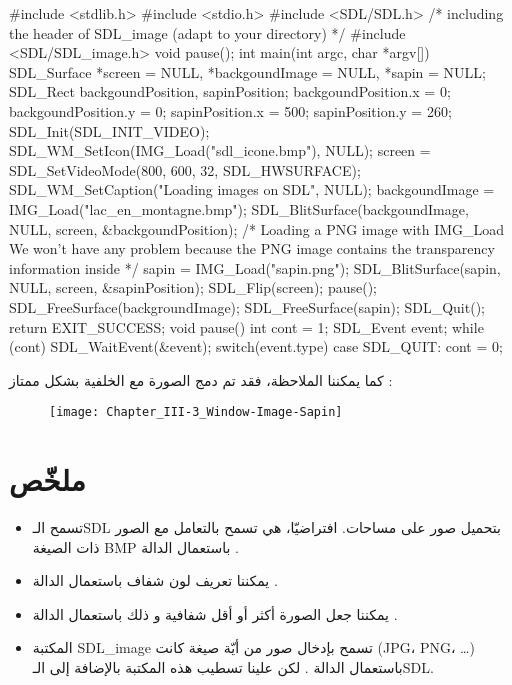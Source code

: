 \begin{Csource}
#include <stdlib.h>
#include <stdio.h>
#include <SDL/SDL.h>
/* including the header of SDL_image (adapt to your directory) */
#include <SDL/SDL_image.h> 
void pause();
int main(int argc, char *argv[])
{
	SDL_Surface *screen = NULL, *backgoundImage = NULL, *sapin = NULL;
	SDL_Rect backgoundPosition, sapinPosition;
	backgoundPosition.x = 0;
	backgoundPosition.y = 0;
	sapinPosition.x = 500;
	sapinPosition.y = 260;
	SDL_Init(SDL_INIT_VIDEO);
	SDL_WM_SetIcon(IMG_Load("sdl_icone.bmp"), NULL);
	screen = SDL_SetVideoMode(800, 600, 32, SDL_HWSURFACE);
	SDL_WM_SetCaption("Loading images on SDL", NULL);
	backgoundImage = IMG_Load("lac_en_montagne.bmp");
	SDL_BlitSurface(backgoundImage, NULL, screen, &backgoundPosition);
	/* Loading a PNG image with IMG_Load
	We won't have any problem because the PNG image contains the transparency information inside */
	sapin = IMG_Load("sapin.png");
	SDL_BlitSurface(sapin, NULL, screen, &sapinPosition); 
	SDL_Flip(screen);
	pause();
	SDL_FreeSurface(backgroundImage);
	SDL_FreeSurface(sapin);
	SDL_Quit();
	return EXIT_SUCCESS;
} 
void pause()
{
	int cont = 1;
	SDL_Event event;
	while (cont)
	{
		SDL_WaitEvent(&event);
		switch(event.type)
		{
			case SDL_QUIT:
			cont = 0;
		}
	}
}
\end{Csource}

كما يمكننا الملاحظة، فقد تم دمج الصورة مع الخلفية بشكل ممتاز :

\begin{figure}[H]
	\centering
	\texttt{[image: Chapter\_III-3\_Window-Image-Sapin]}
\end{figure}

\section*{ملخّص}

\begin{itemize}
	\item تسمح الـ\textenglish{SDL}
	بتحميل صور على مساحات. افتراضيّا، هي تسمح بالتعامل مع الصور ذات الصيغة
	\textenglish{BMP}
	باستعمال الدالة
	.
	\item يمكننا تعريف لون شفاف باستعمال الدالة
	.
	\item يمكننا جعل الصورة أكثر أو أقل شفافية و ذلك باستعمال الدالة 
	.
	\item المكتبة
	\textenglish{SDL\_image}
	تسمح بإدخال صور من أيّة صيغة كانت
	(\textenglish{JPG}، \textenglish{PNG}، \dots)
	باستعمال الدالة
	.
	لكن علينا تسطيب هذه المكتبة بالإضافة إلى الـ\textenglish{SDL}.
\end{itemize}
